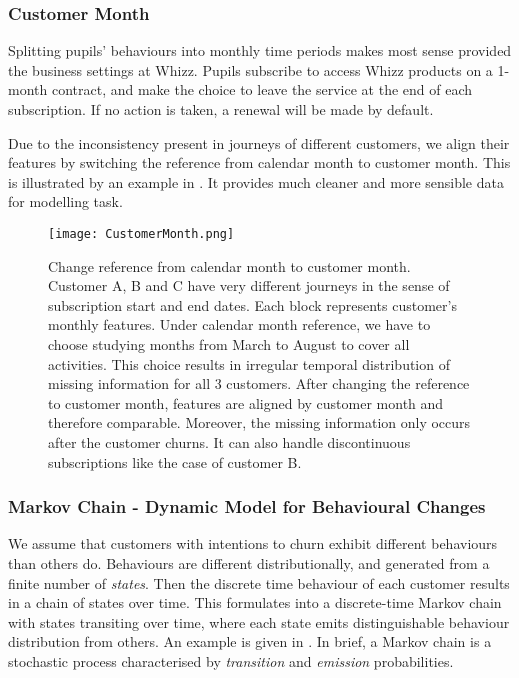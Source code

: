 \subsubsection{Customer Month}

Splitting pupils' behaviours into monthly time periods makes most sense provided the business settings at Whizz. Pupils subscribe to access Whizz products on a 1-month contract, and make the choice to leave the service at the end of each subscription. If no action is taken, a renewal will be made by default.

Due to the inconsistency present in journeys of different customers, we align their features by switching the reference from calendar month to customer month. This is illustrated by an example in . It provides much cleaner and more sensible data for modelling task. 

\begin{figure}[!h]
\centering
\texttt{[image: CustomerMonth.png]}
\caption{Change reference from calendar month to customer month. Customer A, B and C have very different journeys in the sense of subscription start and end dates. Each block represents customer's monthly features. Under calendar month reference, we have to choose studying months from March to August to cover all activities. This choice results in irregular temporal distribution of missing information for all 3 customers. After changing the reference to customer month, features are aligned by customer month and therefore comparable. Moreover, the missing information only occurs after the customer churns. It can also handle discontinuous subscriptions like the case of customer B.}
\label{fig:customerMonth}
\end{figure}

\subsubsection{Markov Chain - Dynamic Model for Behavioural Changes}

We assume that customers with intentions to churn exhibit different behaviours than others do. Behaviours are different distributionally, and generated from a finite number of \textit{states}. Then the discrete time behaviour of each customer results in a chain of states over time. This formulates into a discrete-time Markov chain with states transiting over time, where each state emits distinguishable behaviour distribution from others. An example is given in . In brief, a Markov chain is a stochastic process characterised by \textit{transition} and \textit{emission} probabilities.

